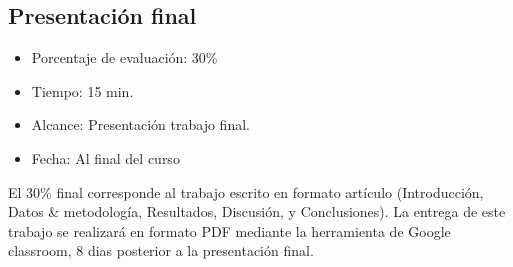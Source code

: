 \documentclass[a4paper,twoside,11pt,]{article}
\begin{document}
\subsection{Presentación final}
\begin{itemize}
    \item Porcentaje de evaluación: 30\%
    \item Tiempo: 15 min.
    \item Alcance: Presentación trabajo final.
    \item Fecha: Al final del curso
\end{itemize}

El 30\% final corresponde al trabajo escrito en formato artículo (Introducción, Datos \& metodología, Resultados, Discusión, 
y Conclusiones). La entrega de este trabajo se realizará en formato PDF mediante la herramienta de Google classroom, 8 dias posterior a la 
presentación final.
\end{document}
